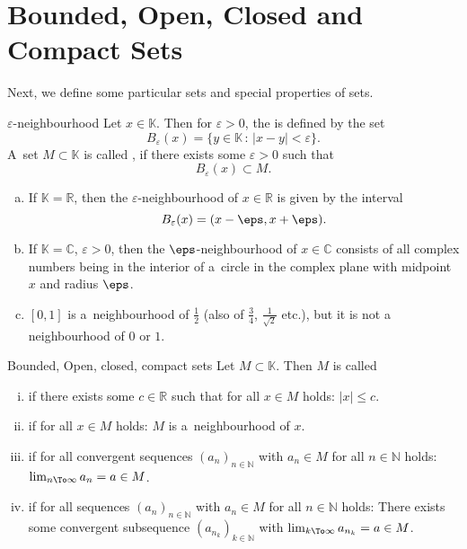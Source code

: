 \section{Bounded, Open, Closed and Compact Sets}
\noindent Next, we define some particular sets and special properties of sets.
\begin{Definition}{$\varepsilon$-neighbourhood}
 Let $x\in \mathbb{K}$. Then for $\varepsilon>0$, the  is defined by the set
\[B_{\varepsilon}(x)=\{y\in \mathbb{K}\,:\,|x-y|<\varepsilon\}.\]
A~set $M\subset \mathbb{K}$ is called , if there exists some $\varepsilon>0$ such that
\[B_{\varepsilon}(x)\subset M.\]
\end{Definition}
\begin{example}
 \begin{enumerate}[(a)]
  \item If $\mathbb{K}=\mathbb{R}$, then the $\varepsilon$-neighbourhood of $x\in\mathbb{R}$ is given by the interval
\[B_{\varepsilon}(x)=(x-\eps,x+\eps).\]
\item If $\mathbb{K}=\mathbb{C}$, $\varepsilon>0$, then the $\eps$-neighbourhood of $x\in\mathbb{C}$ consists of all complex numbers being in the interior of a~circle in the complex plane with midpoint $x$ and radius $\eps$.
\item $[0,1]$ is a~neighbourhood of $\frac12$ (also of $\frac34$, $\frac1{\sqrt{2}}$ etc.), but it is not a neighbourhood of $0$ or $1$.
 \end{enumerate}
\end{example}

\begin{Definition}{Bounded{,} Open{,} closed{,} compact sets}\label{def:clopco}
 Let $M\subset \mathbb{K}$. Then $M$ is called
\begin{enumerate}[(i)]
 \item {} if there exists some $c \in \mathbb{R}$ such that for all $x\in M$ holds: $|x|\leq c$. 
 \item {} if for all $x\in M$ holds: $M$ is a~neighbourhood of $x$.
 \item {} if for all convergent sequences $(a_n)_{n\in\mathbb{N}}$ with $a_n\in M$ for all $n\in\mathbb{N}$ holds: $\lim_{n\To\infty}a_n=a\in M$.
 \item {}  if for all sequences $(a_n)_{n\in\mathbb{N}}$ with $a_n\in M$ for all $n\in\mathbb{N}$ holds: There exists some convergent subsequence $(a_{n_k})_{k\in\mathbb{N}}$ with $\lim_{k\To\infty}a_{n_k}=a\in M$.
\end{enumerate}
\end{Definition}

